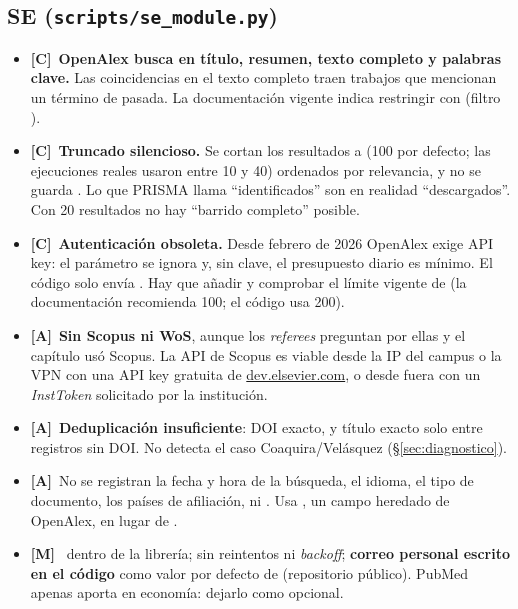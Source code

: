 \documentclass[11pt,a4paper]{article}
\newcommand{\sevC}{\textcolor{crit}{\textbf{[C]}}}
\newcommand{\sevA}{\textcolor{alto}{\textbf{[A]}}}
\newcommand{\sevM}{\textcolor{medio}{\textbf{[M]}}}
\begin{document}
\subsection{SE (\texttt{scripts/se\_module.py})}
\begin{itemize}
  \item \sevC~\textbf{OpenAlex  busca en título, resumen, texto completo y palabras clave.} Las coincidencias en el texto completo traen trabajos que mencionan un término de pasada. La documentación vigente indica restringir con  (filtro ).
  \item \sevC~\textbf{Truncado silencioso.} Se cortan los resultados a  (100 por defecto; las ejecuciones reales usaron entre 10 y 40) ordenados por relevancia, y no se guarda . Lo que PRISMA llama ``identificados'' son en realidad ``descargados''. Con 20 resultados no hay ``barrido completo'' posible.
  \item \sevC~\textbf{Autenticación obsoleta.} Desde febrero de 2026 OpenAlex exige API key: el parámetro  se ignora y, sin clave, el presupuesto diario es mínimo. El código solo envía . Hay que añadir  y comprobar el límite vigente de  (la documentación recomienda 100; el código usa 200).
  \item \sevA~\textbf{Sin Scopus ni WoS}, aunque los \emph{referees} preguntan por ellas y el capítulo usó Scopus. La API de Scopus es viable desde la IP del campus o la VPN con una API key gratuita de \url{dev.elsevier.com}, o desde fuera con un \emph{InstToken} solicitado por la institución.
  \item \sevA~\textbf{Deduplicación insuficiente}: DOI exacto, y título exacto solo entre registros sin DOI. No detecta el caso Coaquira/Velásquez (§\ref{sec:diagnostico}).
  \item \sevA~No se registran la fecha y hora de la búsqueda, el idioma, el tipo de documento, los países de afiliación,  ni . Usa , un campo heredado de OpenAlex, en lugar de .
  \item \sevM~ dentro de la librería; sin reintentos ni \emph{backoff}; \textbf{correo personal escrito en el código} como valor por defecto de  (repositorio público). PubMed apenas aporta en economía: dejarlo como opcional.
\end{itemize}
\end{document}
